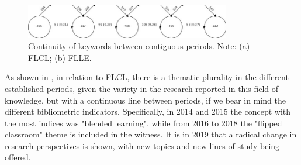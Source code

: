 \documentclass{textolivre-html}
\begin{document}
\begin{figure}[htbp]
 \centering
 \includegraphics[width=0.8\textwidth]{Fig02.png}
 \caption{Continuity of keywords between contiguous periods. Note: (a) FLCL; (b) FLLE.}
 \label{Fig02}
\end{figure}

As shown in , in relation to FLCL, there is a thematic plurality in the different established periods, given the variety in the research reported in this field of knowledge, but with a continuous line between periods, if we bear in mind the different bibliometric indicators. Specifically, in 2014 and 2015 the concept with the most indices was "blended learning", while from 2016 to 2018 the "flipped classroom" theme is included in the witness. It is in 2019 that a radical change in research perspectives is shown, with new topics and new lines of study being offered.
\end{document}
